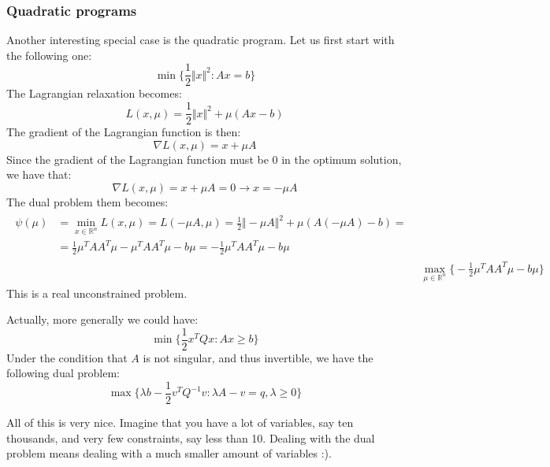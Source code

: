 \subsubsection{Quadratic programs}
\par Another interesting special case is the quadratic program. Let us first start with the following one:
\begin{equation}
    \min\{\frac{1}{2}\Vert x \Vert^2 : Ax = b\}
\end{equation}
The Lagrangian relaxation becomes:
\begin{equation}
    L(x,\mu) = \frac{1}{2}\Vert x \Vert^2 + \mu (Ax - b)
\end{equation}
The gradient of the Lagrangian function is then:
\begin{equation}
    \nabla L(x,\mu) = x + \mu A
\end{equation}
Since the gradient of the Lagrangian function must be 0 in the optimum solution, we have that:
\begin{equation}
    \nabla L(x,\mu) = x + \mu A = 0 \rightarrow x = -\mu A
\end{equation}
The dual problem them becomes:
\begin{align}
    \begin{split}\psi(\mu) &= \min_{x \in \mathbb{R}^n} L(x,\mu) = L(-\mu A, \mu) = \frac{1}{2} \Vert -\mu A \Vert^2 + \mu (A(-\mu A) - b) =\\ &=\frac{1}{2} \mu^T AA^T \mu - \mu^T AA^T \mu - b\mu = -\frac{1}{2}\mu^T AA^T \mu - b\mu\end{split}\\
    &\max_{\mu \in \mathbb{R}^n}\Big\{-\frac{1}{2}\mu^T AA^T \mu - b\mu\Big\}
\end{align}
This is a real unconstrained problem.
\par Actually, more generally we could have:
\begin{equation}
    \min \{\frac{1}{2}x^T Q x : Ax \geq b\}
\end{equation}
Under the condition that $A$ is not singular, and thus invertible, we have the following dual problem:
\begin{equation}
    \max\{\lambda b - \frac{1}{2} v^T Q^{-1} v : \lambda A - v = q, \lambda \geq 0\}
\end{equation}
\par All of this is very nice. Imagine that you have a lot of variables, say ten thousands, and very few constraints, say less than 10. Dealing with the dual problem means dealing with a much smaller amount of variables :).
%
